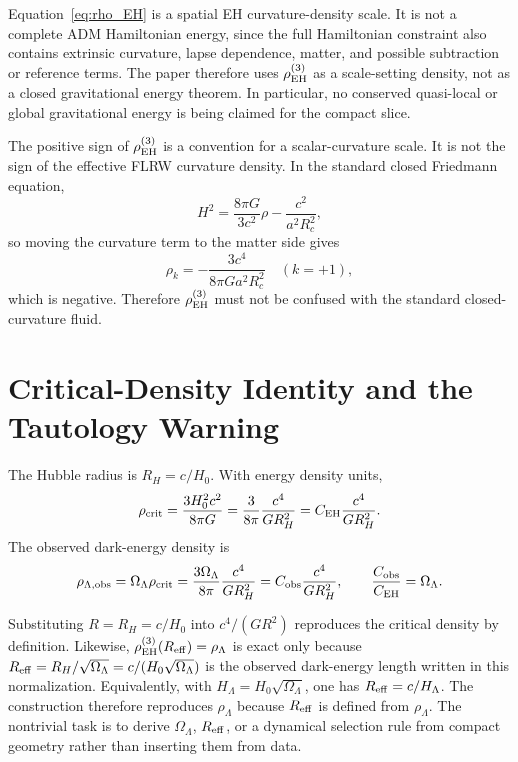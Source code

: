 \documentclass[11pt,a4paper]{article}
\newcommand{\rhoL}{\rho_{\Lambda,{\rm obs}}}
\newcommand{\rhoC}{\rho_{\rm crit}}
\newcommand{\RH}{R_H}
\newcommand{\Reff}{R_{\rm eff}}
\newcommand{\OmL}{\Omega_\Lambda}
\newcommand{\CEH}{C_{\rm EH}}
\newcommand{\Cobs}{C_{\rm obs}}
\begin{document}
\begin{caveatbox}
Equation~\eqref{eq:rho_EH} is a spatial EH curvature-density scale.  It is not a
complete ADM Hamiltonian energy, since the full Hamiltonian constraint also
contains extrinsic curvature, lapse dependence, matter, and possible subtraction
or reference terms.  The paper therefore uses $\rho_{\rm EH}^{(3)}$ as a
scale-setting density, not as a closed gravitational energy theorem.  In particular,
no conserved quasi-local or global gravitational energy is being claimed for the
compact slice.
\end{caveatbox}

\begin{caveatbox}
The positive sign of $\rho_{\rm EH}^{(3)}$ is a convention for a scalar-curvature
scale.  It is not the sign of the effective FLRW curvature density.  In the
standard closed Friedmann equation,
\begin{equation}
H^2=\frac{8\pi G}{3c^2}\rho-\frac{c^2}{a^2R_c^2},
\end{equation}
so moving the curvature term to the matter side gives
\begin{equation}
\rho_k=-\frac{3c^4}{8\pi G a^2R_c^2}\quad(k=+1),
\end{equation}
which is negative.  Therefore $\rho_{\rm EH}^{(3)}$ must not be confused with the
standard closed-curvature fluid.
\end{caveatbox}

\section{Critical-Density Identity and the Tautology Warning}
\label{sec:tautology}

The Hubble radius is $\RH=c/H_0$.  With energy density units,
\begin{equation}
\rhoC=\frac{3H_0^2c^2}{8\pi G}
      =\frac{3}{8\pi}\frac{c^4}{G\RH^2}
      =\CEH\frac{c^4}{G\RH^2}.
\label{eq:crit_EH}
\end{equation}
The observed dark-energy density is
\begin{equation}
\rhoL=\OmL\rhoC
=\frac{3\OmL}{8\pi}\frac{c^4}{G\RH^2}
=\Cobs\frac{c^4}{G\RH^2},
\qquad
\frac{\Cobs}{\CEH}=\OmL.
\label{eq:rhoL}
\end{equation}

\begin{caveatbox}
Substituting $R=\RH=c/H_0$ into $c^4/(GR^2)$ reproduces the critical density by
definition.  Likewise, $\rho_{\rm EH}^{(3)}(\Reff)=\rho_\Lambda$ is exact only
because $\Reff=\RH/\sqrt{\OmL}=c/(H_0\sqrt{\OmL})$ is the observed
dark-energy length written in this normalization.  Equivalently, with
$H_\Lambda=H_0\sqrt{\OmL}$, one has $\Reff=c/H_\Lambda$.  The construction
therefore reproduces $\rho_\Lambda$ because $\Reff$ is defined from
$\rho_\Lambda$.  The nontrivial task is to derive $\OmL$, $\Reff$, or a
dynamical selection rule from compact geometry rather than inserting them from
data.
\end{caveatbox}
\end{document}
